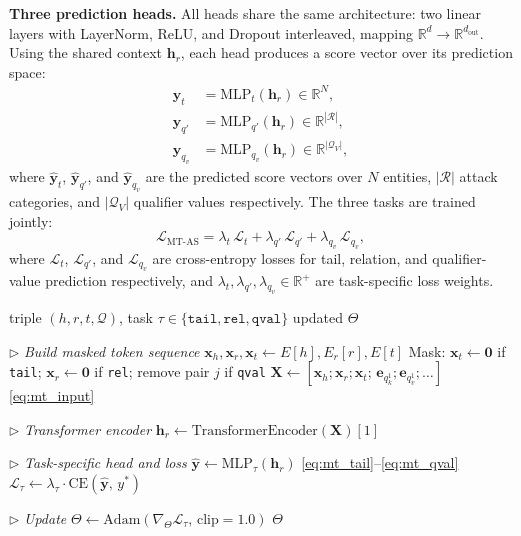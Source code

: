 \documentclass[10pt,journal,compsoc]{IEEEtran}
\begin{document}
\noindent\textbf{Three prediction heads.}
All heads share the same architecture: two linear
layers with LayerNorm, ReLU, and Dropout
interleaved, mapping $\mathbb{R}^d \to
\mathbb{R}^{d_{\mathrm{out}}}$. Using the shared
context $\mathbf{h}_r$, each head produces a
score vector over its prediction space:
\begin{align}
  \hat{\mathbf{y}}_t &= \mathrm{MLP}_t(\mathbf{h}_r)
    \in \mathbb{R}^N,
  \label{eq:mt_tail} \\
  \hat{\mathbf{y}}_{q'} &= \mathrm{MLP}_{q'}(\mathbf{h}_r)
    \in \mathbb{R}^{|\mathcal{R}|},
  \label{eq:mt_rel} \\
  \hat{\mathbf{y}}_{q_v} &= \mathrm{MLP}_{q_v}(\mathbf{h}_r)
    \in \mathbb{R}^{|\mathcal{Q}_V|},
  \label{eq:mt_qval}
\end{align}
where $\hat{\mathbf{y}}_t$, $\hat{\mathbf{y}}_{q'}$,
and $\hat{\mathbf{y}}_{q_v}$ are the predicted score
vectors over $N$ entities, $|\mathcal{R}|$ attack
categories, and $|\mathcal{Q}_V|$ qualifier values
respectively. The three tasks are trained jointly:
\begin{equation}
  \mathcal{L}_{\mathrm{MT\text{-}AS}}
  = \lambda_t\,\mathcal{L}_t
  + \lambda_{q'}\,\mathcal{L}_{q'}
  + \lambda_{q_v}\,\mathcal{L}_{q_v},
  \label{eq:mt_loss}
\end{equation}
where $\mathcal{L}_t$, $\mathcal{L}_{q'}$, and
$\mathcal{L}_{q_v}$ are cross-entropy losses for
tail, relation, and qualifier-value prediction
respectively, and $\lambda_t, \lambda_{q'},
\lambda_{q_v} \in \mathbb{R}^+$ are task-specific
loss weights.

\begin{algorithm}[t]
\caption{MT-AlertStar: Training Step}
\label{alg:mtas}
\begin{algorithmic}[1]
\Require triple $(h, r, t, \mathcal{Q})$,
  task $\tau \in \{
  \texttt{tail}, \texttt{rel}, \texttt{qval}\}$
\Ensure updated $\Theta$

\Statex \hfill $\triangleright$
  \textit{Build masked token sequence}
\State $\mathbf{x}_h, \mathbf{x}_r, \mathbf{x}_t
  \leftarrow E[h], E_r[r], E[t]$
\State Mask: $\mathbf{x}_t{\leftarrow}\mathbf{0}$
  if \texttt{tail};\;
  $\mathbf{x}_r{\leftarrow}\mathbf{0}$
  if \texttt{rel};\;
  remove pair $j$ if \texttt{qval}
\State $\mathbf{X} \leftarrow
  [\mathbf{x}_h;\mathbf{x}_r;\mathbf{x}_t;\,
  \mathbf{e}_{q_k^1};\mathbf{e}_{q_v^1};
  \ldots]$
  \hfill \eqref{eq:mt_input}

\Statex \hfill $\triangleright$
  \textit{Transformer encoder}
\State $\mathbf{h}_r \leftarrow
  \mathrm{TransformerEncoder}(\mathbf{X})[1]$


\Statex \hfill $\triangleright$
  \textit{Task-specific head and loss}
\State $\hat{\mathbf{y}} \leftarrow
  \mathrm{MLP}_\tau(\mathbf{h}_r)$
  \hfill \eqref{eq:mt_tail}--\eqref{eq:mt_qval}
\State $\mathcal{L}_\tau \leftarrow
  \lambda_\tau \cdot
  \mathrm{CE}(\hat{\mathbf{y}},\, y^*)$

\Statex \hfill $\triangleright$
  \textit{Update}
\State $\Theta \leftarrow
  \mathrm{Adam}(\nabla_\Theta
  \mathcal{L}_\tau,\,\mathrm{clip}{=}1.0)$
\State \Return $\Theta$
\end{algorithmic}
\end{algorithm}
\end{document}
